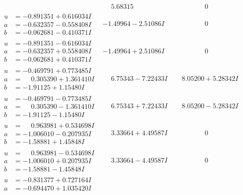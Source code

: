\documentclass[1p]{elsarticle_modified}
\theoremstyle{definition}
\begin{document}
$$\begin{array}{c|c|c}
 & \phantom{-}5.68315\phantom{ +0.000000I} & \phantom{-0.000000 } 0 \\ \hline\begin{aligned}
u &= -0.891351 + 0.616034 I \\
a &= -0.632357 - 0.558408 I \\
b &= -0.062681 - 0.410371 I\end{aligned}
 & -1.49964 - 2.51086 I & \phantom{-0.000000 } 0 \\ \hline\begin{aligned}
u &= -0.891351 - 0.616034 I \\
a &= -0.632357 + 0.558408 I \\
b &= -0.062681 + 0.410371 I\end{aligned}
 & -1.49964 + 2.51086 I & \phantom{-0.000000 } 0 \\ \hline\begin{aligned}
u &= -0.469791 + 0.773485 I \\
a &= \phantom{-}0.305390 + 1.361410 I \\
b &= -1.91125 + 1.15480 I\end{aligned}
 & \phantom{-}6.75343 - 7.22433 I & \phantom{-}8.05200 + 5.28342 I \\ \hline\begin{aligned}
u &= -0.469791 - 0.773485 I \\
a &= \phantom{-}0.305390 - 1.361410 I \\
b &= -1.91125 - 1.15480 I\end{aligned}
 & \phantom{-}6.75343 + 7.22433 I & \phantom{-}8.05200 - 5.28342 I \\ \hline\begin{aligned}
u &= \phantom{-}0.963981 + 0.534698 I \\
a &= -1.006010 - 0.207935 I \\
b &= -1.58881 + 1.45848 I\end{aligned}
 & \phantom{-}3.33664 + 4.49587 I & \phantom{-0.000000 } 0 \\ \hline\begin{aligned}
u &= \phantom{-}0.963981 - 0.534698 I \\
a &= -1.006010 + 0.207935 I \\
b &= -1.58881 - 1.45848 I\end{aligned}
 & \phantom{-}3.33664 - 4.49587 I & \phantom{-0.000000 } 0 \\ \hline\begin{aligned}
u &= -0.831377 + 0.727164 I \\
a &= -0.694470 + 1.035420 I \\

\end{aligned}
\end{array}$$
\end{document}
